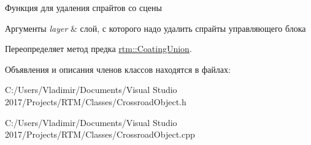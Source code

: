 Функция для удаления спрайтов со сцены 


\begin{DoxyParams}{Аргументы}
{\em layer} & слой, с которого надо удалить спрайты управляющего блока \\
\hline
\end{DoxyParams}


Переопределяет метод предка \hyperlink{classrtm_1_1_coating_union_a4e046aae25ce91da0408ac31a0de4e21}{rtm\+::\+Coating\+Union}.



Объявления и описания членов классов находятся в файлах\+:\begin{DoxyCompactItemize}
\item 
C\+:/\+Users/\+Vladimir/\+Documents/\+Visual Studio 2017/\+Projects/\+R\+T\+M/\+Classes/Crossroad\+Object.\+h\item 
C\+:/\+Users/\+Vladimir/\+Documents/\+Visual Studio 2017/\+Projects/\+R\+T\+M/\+Classes/Crossroad\+Object.\+cpp\end{DoxyCompactItemize}
